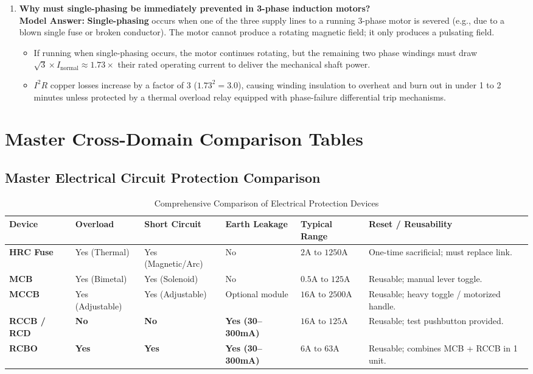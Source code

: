 \begin{enumerate}[leftmargin=*,label=\textbf{Q\arabic*.}]
    \item \textbf{Why must single-phasing be immediately prevented in 3-phase induction motors?} \\
    \textbf{Model Answer:} \textbf{Single-phasing} occurs when one of the three supply lines to a running 3-phase motor is severed (e.g., due to a blown single fuse or broken conductor). The motor cannot produce a rotating magnetic field; it only produces a pulsating field.
    \begin{itemize}
        \item If running when single-phasing occurs, the motor continues rotating, but the remaining two phase windings must draw $\sqrt{3} \times I_{\text{normal}} \approx \mathbf{1.73\times}$ their rated operating current to deliver the mechanical shaft power.
        \item $I^2 R$ copper losses increase by a factor of 3 ($1.73^2 = 3.0$), causing winding insulation to overheat and burn out in under 1 to 2 minutes unless protected by a thermal overload relay equipped with phase-failure differential trip mechanisms.
    \end{itemize}
\end{enumerate}

\section{Master Cross-Domain Comparison Tables}

\subsection{Master Electrical Circuit Protection Comparison}
\begin{table}[H]
\centering
\small
{}
\begin{tabularx}{\linewidth}{l l l l l X}
\toprule
\rowcolor{tableheadercolor}
\textbf{Device} & \textbf{Overload} & \textbf{Short Circuit} & \textbf{Earth Leakage} & \textbf{Typical Range} & \textbf{Reset / Reusability} \\
\midrule
\textbf{HRC Fuse} & Yes (Thermal) & Yes (Magnetic/Arc) & No & $2\text{A to }1250\text{A}$ & One-time sacrificial; must replace link. \\
\textbf{MCB} & Yes (Bimetal) & Yes (Solenoid) & No & $0.5\text{A to }125\text{A}$ & Reusable; manual lever toggle. \\
\textbf{MCCB} & Yes (Adjustable) & Yes (Adjustable) & Optional module & $16\text{A to }2500\text{A}$ & Reusable; heavy toggle / motorized handle. \\
\textbf{RCCB / RCD} & \textbf{No} & \textbf{No} & \textbf{Yes (30--300mA)} & $16\text{A to }125\text{A}$ & Reusable; test pushbutton provided. \\
\textbf{RCBO} & \textbf{Yes} & \textbf{Yes} & \textbf{Yes (30--300mA)} & $6\text{A to }63\text{A}$ & Reusable; combines MCB + RCCB in 1 unit. \\
\bottomrule
\end{tabularx}
\caption{Comprehensive Comparison of Electrical Protection Devices}
\end{table}

